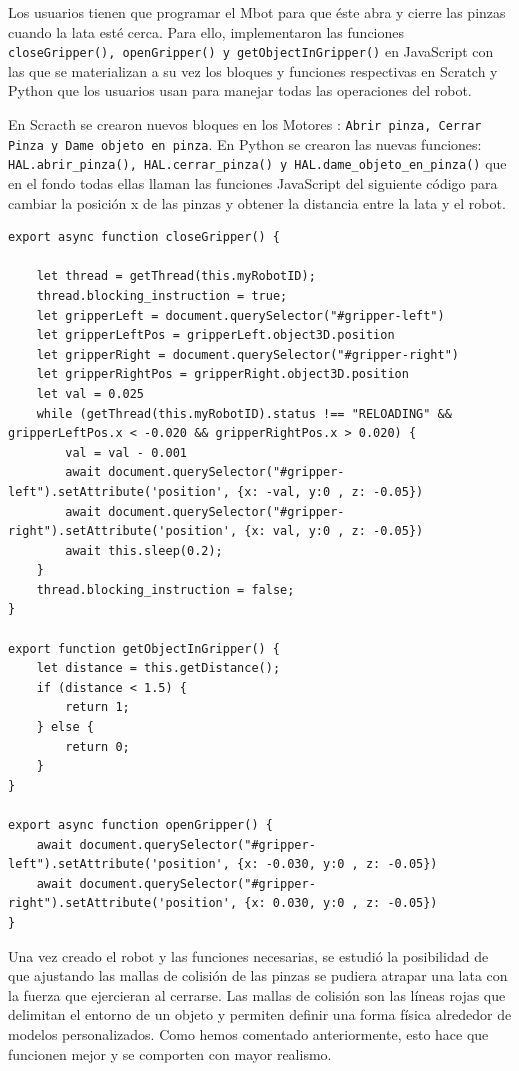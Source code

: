 Los usuarios tienen que programar el Mbot para que éste abra y cierre las pinzas cuando la lata esté cerca. Para ello, implementaron las funciones \texttt{closeGripper(), openGripper() y getObjectInGripper()} en JavaScript con las que se materializan a su vez los bloques y funciones respectivas en Scratch y Python que los usuarios usan para manejar todas las operaciones del robot. 
 
En Scracth se crearon nuevos bloques en los Motores : \texttt{Abrir pinza, Cerrar Pinza y Dame objeto en pinza}.
En Python  se crearon las nuevas funciones: \texttt{HAL.abrir\_pinza(), HAL.cerrar\_pinza() y  HAL.dame\_objeto\_en\_pinza()} que en el fondo todas ellas llaman las funciones JavaScript  del siguiente código para cambiar la posición x de las pinzas y obtener la distancia entre la lata y el robot.
 
\begin{lstlisting}
export async function closeGripper() {

    let thread = getThread(this.myRobotID);
    thread.blocking_instruction = true;
    let gripperLeft = document.querySelector("#gripper-left")
    let gripperLeftPos = gripperLeft.object3D.position
    let gripperRight = document.querySelector("#gripper-right")
    let gripperRightPos = gripperRight.object3D.position
    let val = 0.025
    while (getThread(this.myRobotID).status !== "RELOADING" && gripperLeftPos.x < -0.020 && gripperRightPos.x > 0.020) {
        val = val - 0.001
        await document.querySelector("#gripper-left").setAttribute('position', {x: -val, y:0 , z: -0.05})
        await document.querySelector("#gripper-right").setAttribute('position', {x: val, y:0 , z: -0.05})
        await this.sleep(0.2);
    }
    thread.blocking_instruction = false;
}

export function getObjectInGripper() {
    let distance = this.getDistance();
    if (distance < 1.5) {
        return 1;
    } else {
        return 0;
    }
}

export async function openGripper() {
    await document.querySelector("#gripper-left").setAttribute('position', {x: -0.030, y:0 , z: -0.05})
    await document.querySelector("#gripper-right").setAttribute('position', {x: 0.030, y:0 , z: -0.05})
}
\end{lstlisting}


Una vez creado el robot y las funciones necesarias, se estudió la posibilidad de que ajustando  las mallas de colisión de las pinzas se pudiera atrapar una lata con la fuerza que ejercieran al cerrarse. 
Las mallas de colisión son las líneas rojas que delimitan el entorno de un objeto y permiten definir una forma física alrededor de modelos personalizados. Como hemos comentado anteriormente, esto hace que funcionen mejor y se comporten con mayor realismo.

